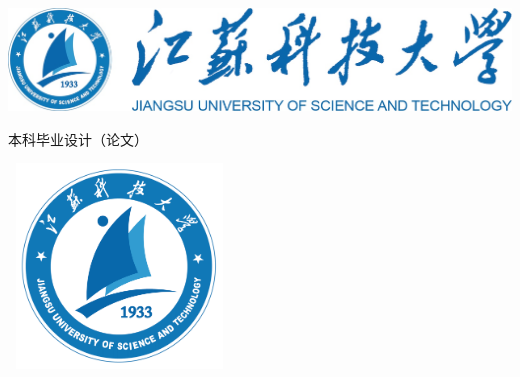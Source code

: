 \begin{titlepage}
    \setlength{\headsep}{1.3cm}
    {
    
              \begin{center}
              \includegraphics[scale = 0.2 ]{./pic/just.png}
              \end{center}
    }
              \vspace{-12mm}
            \begin{center}
                \setlength{\baselineskip}{0pt}\fakeli {}本科毕业设计（论文）
            \end{center}
    
            \vspace{-3.8mm}
              \begin{center}
              \includegraphics[height=5.45cm,width=5.9cm]{./pic/justlogo.png}
              \end{center}
            \vspace{-1pt}
            \begin{center}\fakehei{}\Title \end{center}
            \vspace{8ex}
    

\end{titlepage}
